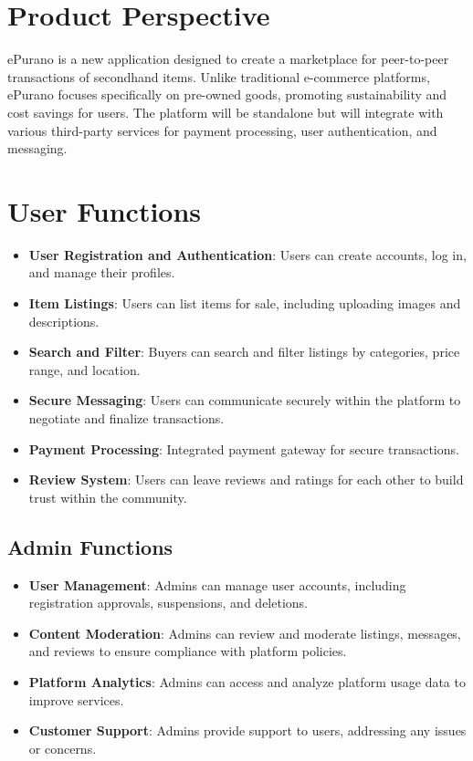 
\section{Product Perspective}

ePurano is a new application designed to create a marketplace for peer-to-peer transactions of secondhand items. Unlike traditional e-commerce platforms, ePurano focuses specifically on pre-owned goods, promoting sustainability and cost savings for users. The platform will be standalone but will integrate with various third-party services for payment processing, user authentication, and messaging.


\section{User Functions}

\begin{itemize}
    \item \textbf{User Registration and Authentication}: Users can create accounts, log in, and manage their profiles.
    \item \textbf{Item Listings}: Users can list items for sale, including uploading images and descriptions.
    \item \textbf{Search and Filter}: Buyers can search and filter listings by categories, price range, and location.
    \item \textbf{Secure Messaging}: Users can communicate securely within the platform to negotiate and finalize transactions.
    \item \textbf{Payment Processing}: Integrated payment gateway for secure transactions.
    \item \textbf{Review System}: Users can leave reviews and ratings for each other to build trust within the community.
\end{itemize}

\subsection{Admin Functions}

\begin{itemize}
    \item \textbf{User Management}: Admins can manage user accounts, including registration approvals, suspensions, and deletions.
    \item \textbf{Content Moderation}: Admins can review and moderate listings, messages, and reviews to ensure compliance with platform policies.
    \item \textbf{Platform Analytics}: Admins can access and analyze platform usage data to improve services.
    \item \textbf{Customer Support}: Admins provide support to users, addressing any issues or concerns.
\end{itemize}

